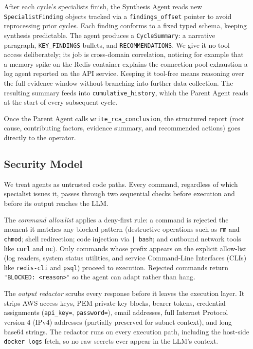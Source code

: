\documentclass[conference]{IEEEtran}
\begin{document}
After each cycle's specialists finish, the Synthesis Agent reads new
\texttt{SpecialistFinding} objects tracked via a \texttt{findings\_offset} pointer to
avoid reprocessing prior cycles. Each finding conforms to a fixed typed schema, keeping
synthesis predictable. The agent
produces a \texttt{CycleSummary}: a narrative paragraph,
\texttt{KEY\_FINDINGS} bullets, and \texttt{RECOMMENDATIONS}. We give
it no tool access deliberately; its job is cross-domain correlation,
noticing for example that a memory spike on the Redis container
explains the connection-pool exhaustion a log agent reported on the
API service. Keeping it tool-free means reasoning over the full
evidence window without branching into further data collection.
The resulting summary feeds into \texttt{cumulative\_history}, which
the Parent Agent reads at the start of every subsequent cycle.

Once the Parent Agent calls \texttt{write\_rca\_conclusion}, the
structured report (root cause, contributing factors, evidence
summary, and recommended actions) goes directly to the operator.

\subsection{Security Model}

We treat agents as untrusted code paths. Every command, regardless of
which specialist issues it, passes through two sequential checks before
execution and before its output reaches the LLM.

The \textit{command allowlist} applies a deny-first rule: a command is
rejected the moment it matches any blocked pattern (destructive
operations such as \texttt{rm} and \texttt{chmod}; shell redirection;
code injection via \texttt{| bash}; and outbound network tools like
\texttt{curl} and \texttt{nc}). Only commands whose prefix appears on
the explicit allow-list (log readers, system status utilities, and
service Command-Line Interfaces (CLIs) like \texttt{redis-cli} and \texttt{psql}) proceed to
execution. Rejected commands return \texttt{"BLOCKED: <reason>"} so
the agent can adapt rather than hang.

The \textit{output redactor} scrubs every response before it leaves
the execution layer. It strips AWS access keys, PEM private-key
blocks, bearer tokens, credential assignments
(\texttt{api\_key=}, \texttt{password=}), email addresses, full Internet Protocol version 4 (IPv4)
addresses (partially preserved for subnet context), and long base64
strings. The redactor runs on every execution path, including the
host-side \texttt{docker logs} fetch, so no raw secrets ever appear
in the LLM's context.
\end{document}
